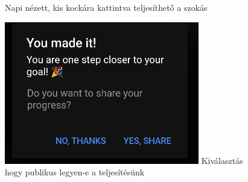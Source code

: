 \documentclass[12pt]{report}
\begin{document}
\begin{figure}[H]
\begin{minipage}[b]{0.3\textwidth}
       Napi nézett, kis kockára kattintva teljesíthető a szokás
    \end{minipage}
    \hfill
    \begin{minipage}[b]{0.3\textwidth}
        \centering
        \includegraphics[width=\linewidth]{src/habitdone2.png}
        Kiválasztás hogy publikus legyen-e a teljesítésünk
    \end{minipage}
    \hfill
    \begin{minipage}[b]{0.3\textwidth}
        \centering

\end{minipage}
\end{figure}
\end{document}
